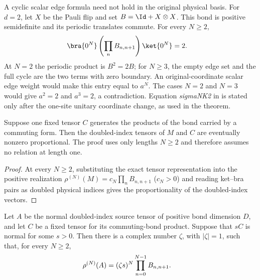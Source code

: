 \begin{remark}
    A cyclic scalar edge formula need not hold in the original physical basis.
    For $d=2$, let $X$ be the Pauli flip and set $B=\Id+X\otimes X$. This bond
    is positive semidefinite and its periodic translates commute. For every
    $N\ge2$,
    \begin{align}
        \bra{0^N}
        \left(\prod_n B_{n,n+1}\right)
        \ket{0^N}
         & =2.
        \notag
    \end{align}
    At $N=2$ the periodic product is $B^2=2B$; for $N\ge3$, the empty edge
    set and the full cycle are the two terms with zero boundary. An
    original-coordinate scalar edge weight would make this entry equal to
    $a^N$. The cases $N=2$ and $N=3$ would give $a^2=2$ and $a^3=2$, a
    contradiction. Equation \emph{sigmaNK2} in
    \cite[Appendix~C.2, lines~1581--1589]{Cirac2016MPDO_arXiv} is stated only
    after the one-site unitary coordinate change, as used in the theorem.
\end{remark}

\begin{lemma}
    \label{thm:mpdo_eta_fixed_product_tensor_eventual_proportionality}
    \leanok
    Suppose one fixed tensor $C$ generates the products of the bond carried
    by a commuting form. Then the doubled-index tensors of $M$ and
    $C$ are eventually nonzero proportional. The proof uses only lengths
    $N\ge2$ and therefore assumes no relation at length one.
\end{lemma}

\begin{proof}\leanok
    At every $N\ge2$, substituting the exact tensor representation into the
    positive realization
    $\rho^{(N)}(M)=c_N\prod_n B_{n,n+1}$ ($c_N>0$) and reading ket--bra
    pairs as doubled physical indices gives the proportionality of the
    doubled-index vectors.
\end{proof}

\begin{lemma}
    \label{thm:mpdo_eta_normal_rescaling_geometric_phase}
    \leanok
    Let $A$ be the normal doubled-index source tensor of positive bond
    dimension $D$, and let $C$ be a fixed tensor for its commuting-bond
    product. Suppose that $sC$ is normal for some $s>0$. Then there is a
    complex number $\zeta$, with $|\zeta|=1$, such that, for every $N\ge2$,
    \begin{align}
        \rho^{(N)}(A)
         & =
        (\zeta s)^N\prod_{n=0}^{N-1}B_{n,n+1}.
        \notag
    \end{align}
\end{lemma}

